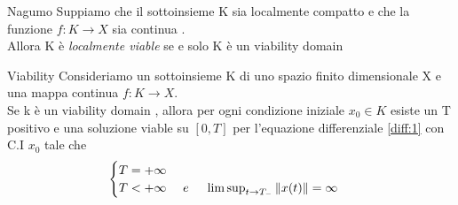\documentclass{article}
\begin{document}
	\begin{teo}{Nagumo}{}
	 Suppiamo che il sottoinsieme K sia localmente compatto e che la funzione $f : K \rightarrow X$ sia continua . \\ Allora K è \textit{ localmente viable  } se e solo K è un viability domain
	\end{teo}
\begin{teo}{Viability}{}
	Consideriamo un sottoinsieme K di uno spazio finito dimensionale X e una mappa continua  $f : K \rightarrow X$. \\ Se k è un viability domain , allora per ogni condizione iniziale $x_0\in K $ esiste un T positivo e una soluzione viable su $[0,T]$ per l'equazione differenziale \ref{diff:1} con C.I $x_0$ tale che 
	$$\begin{cases}
		T= + \infty  \\ 
		T < +\infty \ \ \ \  e \ \ \ \  \limsup_{t\rightarrow T_-} \norm{x(t)}= \infty 
	\end{cases}$$
\end{teo}










\printbibliography[heading=bibintoc,title=Bibliografia]

	
\end{document}
